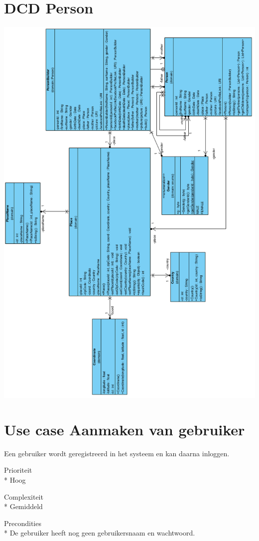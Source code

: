 \documentclass[pdftex,a4paper,12pt,twoside]{report}
\begin{document}
\section{DCD Person}
\includegraphics[width=\textwidth, height=\textheight]{images/DCDpersondomain.png}

\section{Use case Aanmaken van gebruiker}
Een gebruiker wordt geregistreerd in het systeem en kan daarna inloggen.

Prioriteit\\*
Hoog

Complexiteit\\*
Gemiddeld

Precondities \\*
De gebruiker heeft nog geen gebruikersnaam en wachtwoord.
\end{document}
